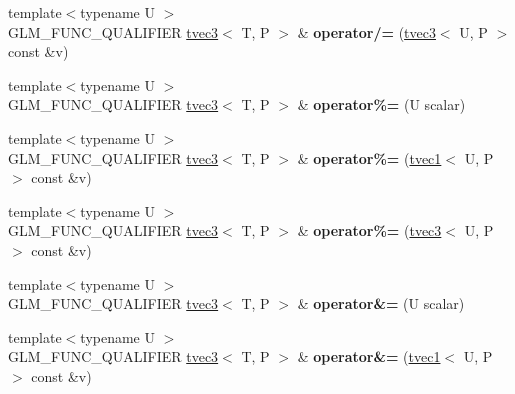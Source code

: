 \begin{DoxyCompactItemize}
\item 
\hypertarget{structglm_1_1tvec3_ad71db80da3ef78d0ac88533c9177ea77}{{\footnotesize template$<$typename U $>$ }\\G\-L\-M\-\_\-\-F\-U\-N\-C\-\_\-\-Q\-U\-A\-L\-I\-F\-I\-E\-R \hyperlink{structglm_1_1tvec3}{tvec3}$<$ T, P $>$ \& {\bfseries operator/=} (\hyperlink{structglm_1_1tvec3}{tvec3}$<$ U, P $>$ const \&v)}\label{structglm_1_1tvec3_ad71db80da3ef78d0ac88533c9177ea77}

\item 
\hypertarget{structglm_1_1tvec3_acfb20e1b76ecfdd8487ab0f9d1a9420f}{{\footnotesize template$<$typename U $>$ }\\G\-L\-M\-\_\-\-F\-U\-N\-C\-\_\-\-Q\-U\-A\-L\-I\-F\-I\-E\-R \hyperlink{structglm_1_1tvec3}{tvec3}$<$ T, P $>$ \& {\bfseries operator\%=} (U scalar)}\label{structglm_1_1tvec3_acfb20e1b76ecfdd8487ab0f9d1a9420f}

\item 
\hypertarget{structglm_1_1tvec3_aea61db59d6e74810ebdd814c44d0c7d2}{{\footnotesize template$<$typename U $>$ }\\G\-L\-M\-\_\-\-F\-U\-N\-C\-\_\-\-Q\-U\-A\-L\-I\-F\-I\-E\-R \hyperlink{structglm_1_1tvec3}{tvec3}$<$ T, P $>$ \& {\bfseries operator\%=} (\hyperlink{structglm_1_1tvec1}{tvec1}$<$ U, P $>$ const \&v)}\label{structglm_1_1tvec3_aea61db59d6e74810ebdd814c44d0c7d2}

\item 
\hypertarget{structglm_1_1tvec3_a4a0e1e225a1525d06c194dec0e966b67}{{\footnotesize template$<$typename U $>$ }\\G\-L\-M\-\_\-\-F\-U\-N\-C\-\_\-\-Q\-U\-A\-L\-I\-F\-I\-E\-R \hyperlink{structglm_1_1tvec3}{tvec3}$<$ T, P $>$ \& {\bfseries operator\%=} (\hyperlink{structglm_1_1tvec3}{tvec3}$<$ U, P $>$ const \&v)}\label{structglm_1_1tvec3_a4a0e1e225a1525d06c194dec0e966b67}

\item 
\hypertarget{structglm_1_1tvec3_a86c329f940b7e44bf71452f5f13e21ba}{{\footnotesize template$<$typename U $>$ }\\G\-L\-M\-\_\-\-F\-U\-N\-C\-\_\-\-Q\-U\-A\-L\-I\-F\-I\-E\-R \hyperlink{structglm_1_1tvec3}{tvec3}$<$ T, P $>$ \& {\bfseries operator\&=} (U scalar)}\label{structglm_1_1tvec3_a86c329f940b7e44bf71452f5f13e21ba}

\item 
\hypertarget{structglm_1_1tvec3_a2553d75c1533a163ed6526f903e8a061}{{\footnotesize template$<$typename U $>$ }\\G\-L\-M\-\_\-\-F\-U\-N\-C\-\_\-\-Q\-U\-A\-L\-I\-F\-I\-E\-R \hyperlink{structglm_1_1tvec3}{tvec3}$<$ T, P $>$ \& {\bfseries operator\&=} (\hyperlink{structglm_1_1tvec1}{tvec1}$<$ U, P $>$ const \&v)}\label{structglm_1_1tvec3_a2553d75c1533a163ed6526f903e8a061}


\end{DoxyCompactItemize}
